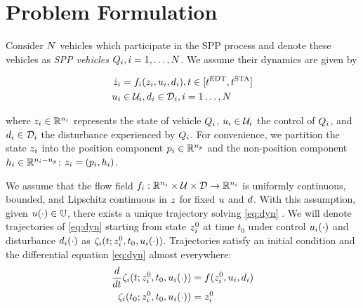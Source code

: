 \section{Problem Formulation \label{sec:formulation}}
Consider $N$ vehicles which participate in the SPP process and denote these vehicles as \textit{SPP vehicles} $Q_{i}, i = 1, \ldots, N$. We assume their dynamics are given by

\begin{equation}
\label{eq:dyn}
\begin{aligned}
\dot\state_i &= \fdyn_i(\state_i, \ctrl_i, \dstb_i), t \in [\edt, \sta] \\
\ctrl_i &\in \cset_i, \dstb_i \in \dset_i, i = 1 \ldots, \N
\end{aligned}
\end{equation}

\noindent where $z_i \in \mathbb{R}^{n_i}$ represents the state of vehicle $Q_{i}$, $u_i \in \mathcal{U}_i$ the control of $Q_{i}$, and $d_i \in \mathcal{D}_i$ the disturbance experienced by $Q_{i}$. For convenience, we partition the state $z_i$ into the position component $p_i \in \mathbb{R}^{n_p}$ and the non-position component $h_i \in \mathbb{R}^{n_i - n_p}$: $z_i = (p_i, h_i)$.

We assume that the flow field $f_i: \mathbb{R}^{n_i}\times\mathcal{U}\times\mathcal{D} \rightarrow \mathbb{R}^{n_i}$ is uniformly continuous, bounded, and Lipschitz continuous in $z$ for fixed $u$ and $d$. With this assumption, given $u(\cdot) \in \mathbb{U}$, there exists a unique trajectory solving \eqref{eq:dyn} \cite{}. We will denote trajectories of \eqref{eq:dyn} starting from state $z^0_i$ at time $t_0$ under control $u_i(\cdot)$ and disturbance $d_i(\cdot)$ as $\zeta_i(t; z^0_i, t_0, u_i(\cdot))$. Trajectories satisfy an initial condition and the differential equation \eqref{eq:dyn} almost everywhere:
\begin{equation}
\begin{aligned}
\frac{d}{dt}\zeta_i(t; z^0_i, t_0, u_i(\cdot)) &= f(z^0_i, u_i, d_i) \\
\zeta_i(t_0; z^0_i, t_0, u_i(\cdot)) &= z^0_i
\end{aligned}
\end{equation}

